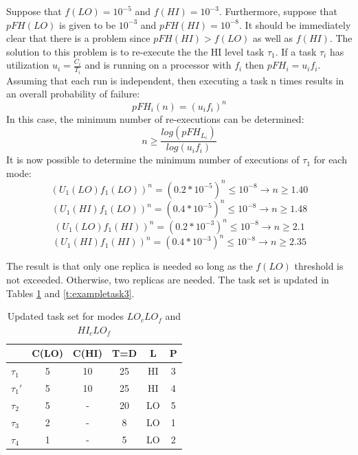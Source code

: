 \documentclass[table,11pt]{article}
\begin{document}
Suppose that $f(LO)=10^{-5}$ and $f(HI)=10^{-3}$. Furthermore, suppose that $pFH(LO)$ is given to be $10^{-3}$ and $pFH(HI)=10^{-8}$. It should be immediately clear that there is a problem since $pFH(HI)>f(LO)$ as well as $f(HI)$. The solution to this problem is to re-execute the the HI level task $\tau_{1}$. If a task $\tau_i$ has utilization $u_i = \frac{C_i}{T_i}$ and is running on a processor with $f_i$ then $pFH_i=u_if_i$. Assuming that each run is independent, then executing a task n times results in an overall probability of failure:
\begin{equation} 
pFH_i(n)=(u_if_i)^n
\end{equation}
In this case, the minimum number of re-executions can be determined:
\begin{equation}
n \geq \frac{log(pFH_{L_i})}{log(u_if_i)}
\end{equation}
It is now possible to determine the minimum number of executions of $\tau_1$ for each mode:
\begin{equation}
   (U_1(LO)f_1(LO))^n=(0.2*10^{-5})^n \leq 10^{-8} \rightarrow n \geq 1.40
\end{equation}
\begin{equation}
   (U_1(HI)f_1(LO))^n=(0.4*10^{-5})^n \leq 10^{-8} \rightarrow n \geq 1.48
\end{equation}
\begin{equation}
   (U_1(LO)f_1(HI))^n=(0.2*10^{-3})^n \leq 10^{-8} \rightarrow n \geq 2.1
\end{equation}
\begin{equation}
   (U_1(HI)f_1(HI))^n=(0.4*10^{-3})^n \leq 10^{-8} \rightarrow n \geq 2.35
\end{equation}

	The result is that only one replica is needed so long as the $f(LO)$ threshold is not exceeded. Otherwise, two replicas are needed. The task set is updated in Tables \ref{t:exampletask2} and \ref{t:exampletask3}.

\begin{table}
\centering
\caption{Updated task set for modes $LO_cLO_f$ and $HI_cLO_f$}
\begin{tabular}{@{}l|ccccc@{}}
\toprule
		& C(LO) & C(HI) & T=D & L & P	 \\\bottomrule
$\tau_1$ & 5 & 10 & 25 & HI & 3 \\
$\tau_1'$ & 5 & 10 & 25 & HI & 4 \\
$\tau_2$ & 5 & - & 20 & LO & 5 \\
$\tau_3$ & 2 & - & 8 & LO & 1 \\
$\tau_4$ & 1 & - & 5 & LO & 2 \\
\end{tabular}
\label{t:exampletask2}
\end{table}
\end{document}
